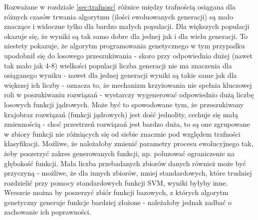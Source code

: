 \documentclass{article}
\begin{document}
		Rozważane w rozdziale \ref{sec:trafnosc} różnice między trafnością osiągana dla różnych czasów trwania algorytmu (ilości ewoluowanych generacji) są mało znaczące i widoczne tylko dla bardzo małych populacji. Dla większych populacji okazuje się, że wyniki są tak samo dobre dla jednej jak i dla wielu generacji. To niestety pokazuje, że algorytm programowania genetycznego w tym przypadku upodobnił się do losowego przeszukiwania - skoro przy odpowiednio dużej (nawet tak mało jak 4-8) wielkości populacji liczba generacji nie ma znaczenia dla osiąganego wyniku - nawet dla jednej generacji wyniki są takie same jak dla większej ich liczby - oznacza to, że mechanizm krzyżowania nie spełnia kluczowej roli w poszukiwaniu rozwiązań - wystarczy wygenerować odpowiednio dużą liczbę losowych funkcji jądrowych. Może być to spowodowane tym, że przeszukiwany krajobraz rozwiązań (funkcji jądrowych) jest dość jednolity, cechuje się małą zmiennością - choć przestrzeń rozwiązań jest bardzo duża, to są one zgrupowane w zbiory funkcji nie różniących się od siebie znacznie pod względem trafności klasyfikacji. Możliwe, że należałoby zmienić parametry procesu ewolucyjnego tak, żeby poszerzyć zakres generowanych funkcji, np. poluzować ograniczenie na głębokość funkcji. Mała liczba przebadanych zbiorów danych również może być przyczyną - możliwe, że dla innych zbiorów, mniej standardowych, które trudniej rozdzielić przy pomocy standardowych funkcji SVM, wyniki byłyby inne. Wreszcie można by poszerzyć zbiór funkcji bazowych, z których algorytm genetyczny generuje funkcje bardziej złożone - należałoby jednak zadbać o zachowanie ich poprawności.




\end{document}
